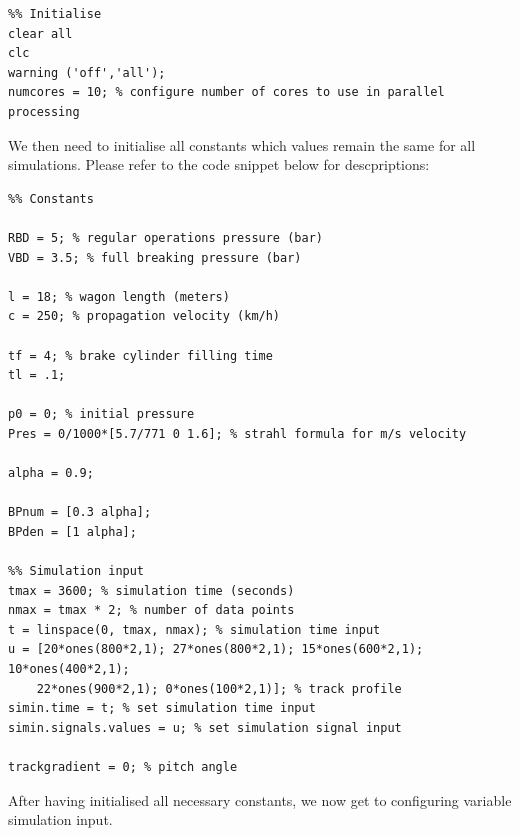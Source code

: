 \begin{lstlisting}
%% Initialise
clear all
clc
warning ('off','all');
numcores = 10; % configure number of cores to use in parallel processing
\end{lstlisting}

\par\noindent
We then need to initialise all constants which values remain the same for all simulations. Please refer to the code snippet below for descpriptions:

\begin{lstlisting}
%% Constants

RBD = 5; % regular operations pressure (bar)
VBD = 3.5; % full breaking pressure (bar)

l = 18; % wagon length (meters)
c = 250; % propagation velocity (km/h)

tf = 4; % brake cylinder filling time
tl = .1; 

p0 = 0; % initial pressure
Pres = 0/1000*[5.7/771 0 1.6]; % strahl formula for m/s velocity

alpha = 0.9; 

BPnum = [0.3 alpha]; 
BPden = [1 alpha]; 

%% Simulation input
tmax = 3600; % simulation time (seconds)
nmax = tmax * 2; % number of data points
t = linspace(0, tmax, nmax); % simulation time input
u = [20*ones(800*2,1); 27*ones(800*2,1); 15*ones(600*2,1); 10*ones(400*2,1); 
	22*ones(900*2,1); 0*ones(100*2,1)]; % track profile
simin.time = t; % set simulation time input
simin.signals.values = u; % set simulation signal input

trackgradient = 0; % pitch angle
\end{lstlisting}

\par\noindent
After having initialised all necessary constants, we now get to configuring variable simulation input.

